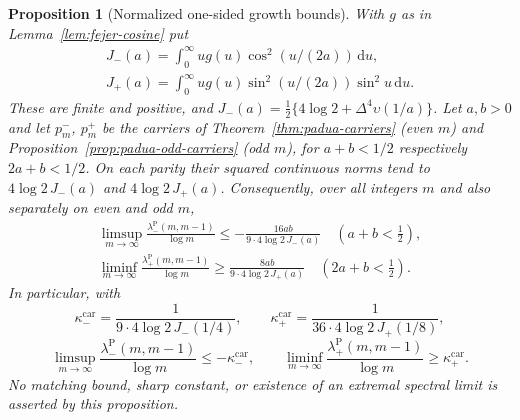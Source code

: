 \documentclass[preprint,12pt,a4paper]{elsarticle}
\newtheorem{proposition}[theorem]{Proposition}
\theoremstyle{remark}
\newcommand{\Pa}{\mathrm P}
\newcommand{\dd}{\,\mathrm d}
\begin{document}
\begin{proposition}[Normalized one-sided growth bounds]\label{prop:padua-growth}
With $g$ as in Lemma~\ref{lem:fejer-cosine} put
\[
 \begin{gathered}
 J_-(a)=\int_0^\infty u g(u)\cos^2(u/(2a))\dd u,\\
 J_+(a)=\int_0^\infty u g(u)\sin^2(u/(2a))\sin^2u\dd u.
 \end{gathered}
\]
These are finite and positive, and
$J_-(a)=\tfrac12\{4\log2+\Delta^4\upsilon(1/a)\}$.
Let $a,b>0$ and let $p_m^-$, $p_m^+$ be the carriers of
Theorem~\ref{thm:padua-carriers} (even $m$) and
Proposition~\ref{prop:padua-odd-carriers} (odd $m$), for $a+b<1/2$
respectively $2a+b<1/2$. On each parity their squared continuous norms
tend to $4\log2\,J_-(a)$ and $4\log2\,J_+(a)$. Consequently, over all
integers $m$ and also separately on even and odd $m$,
\begin{equation}\label{eq:padua-growth-fixed}
 \begin{gathered}
 \limsup_{m\to\infty}\frac{\lambda^\Pa_-(m,m-1)}{\log m}
 \le-\frac{16ab}{9\cdot4\log2\,J_-(a)}\quad(a+b<\tfrac12),\\
 \liminf_{m\to\infty}\frac{\lambda^\Pa_+(m,m-1)}{\log m}
 \ge\frac{8ab}{9\cdot4\log2\,J_+(a)}\quad(2a+b<\tfrac12).
 \end{gathered}
\end{equation}
In particular, with
\[
 \kappa^{\mathrm{car}}_-=\frac1{9\cdot4\log2\,J_-(1/4)},\qquad
 \kappa^{\mathrm{car}}_+=\frac1{36\cdot4\log2\,J_+(1/8)},
\]
\begin{equation}\label{eq:padua-growth-bounds}
 \limsup_{m\to\infty}\frac{\lambda^\Pa_-(m,m-1)}{\log m}
 \le-\kappa^{\mathrm{car}}_-,\qquad
 \liminf_{m\to\infty}\frac{\lambda^\Pa_+(m,m-1)}{\log m}
 \ge\kappa^{\mathrm{car}}_+.
\end{equation}
No matching bound, sharp constant, or existence of an extremal spectral
limit is asserted by this proposition.
\end{proposition}
\end{document}
